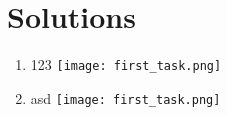 \documentclass{article}
\begin{document}

\section*{Solutions}
\begin{enumerate}
        \item 123 \makebox[0pt][l]{}
        \texttt{[image: first\_task.png]}
    
        \item asd \makebox[0pt][l]{}
        \texttt{[image: first\_task.png]}
\end{enumerate}
\end{document}
